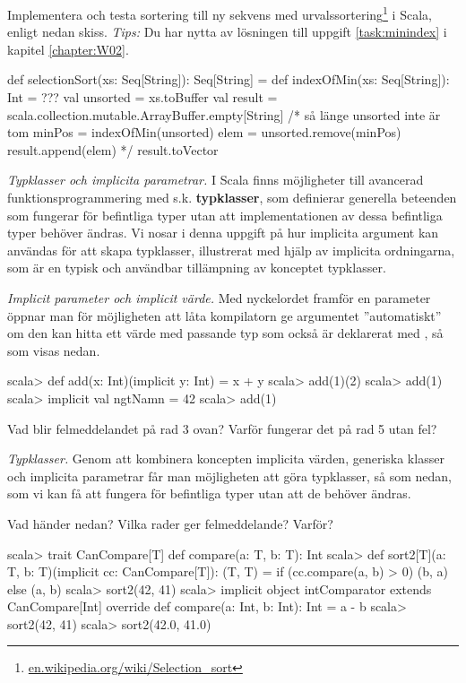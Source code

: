 \Task Implementera och testa sortering till ny sekvens med urvalssortering\footnote{\href{https://en.wikipedia.org/wiki/Selection_sort}{en.wikipedia.org/wiki/Selection\_sort}} i Scala, enligt nedan skiss. \emph{Tips:} Du har nytta av lösningen till uppgift \ref{task:minindex} i kapitel \ref{chapter:W02}.
\begin{Code}
def selectionSort(xs: Seq[String]): Seq[String] = {
  def indexOfMin(xs: Seq[String]): Int = ??? 
  val unsorted = xs.toBuffer
  val result = scala.collection.mutable.ArrayBuffer.empty[String]
  /* 
  så länge unsorted inte är tom {
    minPos = indexOfMin(unsorted)
    elem   = unsorted.remove(minPos)
    result.append(elem)
  }
  */
  result.toVector
}
\end{Code} 


\AdvancedTasks %

\Task \emph{Typklasser och implicita parametrar.} I Scala finns möjligheter till avancerad funktionsprogrammering med s.k. \textbf{typklasser}, som definierar generella beteenden som fungerar för befintliga typer utan att implementationen av dessa befintliga typer behöver ändras. Vi nosar i denna uppgift på hur implicita argument kan användas för att skapa typklasser, illustrerat med hjälp av implicita ordningarna, som är en typisk och användbar tillämpning av konceptet typklasser. 

\Subtask \emph{Implicit parameter och implicit värde.} Med nyckelordet  framför en parameter öppnar man för möjligheten att låta kompilatorn ge argumentet ''automatiskt'' om den kan hitta ett värde med passande typ som också är deklarerat med , så som visas nedan. 
\begin{REPL}
scala> def add(x: Int)(implicit y: Int) = x + y
scala> add(1)(2)
scala> add(1)
scala> implicit val ngtNamn = 42   
scala> add(1)
\end{REPL}
Vad blir felmeddelandet på rad 3 ovan? Varför fungerar det på rad 5 utan fel?

\Subtask \emph{Typklasser.} Genom att kombinera koncepten implicita värden, generiska klasser och implicita parametrar får man möjligheten att göra typklasser, så som  nedan, som vi kan få att fungera för befintliga typer utan att de behöver ändras. 

Vad händer nedan? Vilka rader ger felmeddelande? Varför? 

\begin{REPL}
scala> trait CanCompare[T] { def compare(a: T, b: T): Int }
scala> def sort2[T](a: T, b: T)(implicit cc: CanCompare[T]): (T, T) = 
         if (cc.compare(a, b) > 0) (b, a) else (a, b)  
scala> sort2(42, 41)
scala> implicit object intComparator extends CanCompare[Int]{
         override def compare(a: Int, b: Int): Int = a - b
       } 
scala> sort2(42, 41)
scala> sort2(42.0, 41.0)
\end{REPL}

